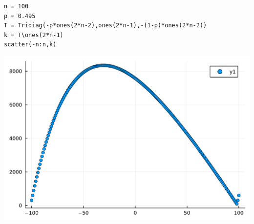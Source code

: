 \documentclass[12pt,a4paper]{article}
\begin{document}
\begin{verbatim}
n = 100
p = 0.495
T = Tridiag(-p*ones(2*n-2),ones(2*n-1),-(1-p)*ones(2*n-2))
k = T\ones(2*n-1)
scatter(-n:n,k)
\end{verbatim}
\includegraphics[width=\linewidth]{jl_KF4mRK/demo_9_1.pdf}
\end{document}

